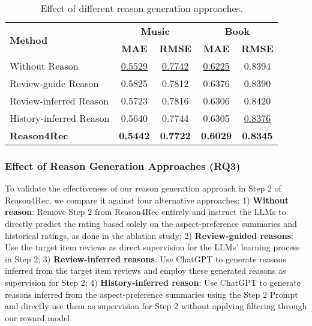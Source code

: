 \begin{table}[t]
\centering
\caption{Effect of different reason generation approaches.}
\begin{tabular}{lcccc}
\toprule
\multirow{2}{*}{\bf Method} & \multicolumn{2}{c}{\bf Music} & \multicolumn{2}{c}{\bf Book} \\ \cmidrule(lr){2-3} \cmidrule(lr){4-5}
                        & \bf MAE             & \bf RMSE           & \bf MAE             & \bf RMSE           \\ \midrule

Without Reason          & \underline{0.5529}          & \underline{0.7742}          & \underline{0.6225}          & 0.8394          \\
Review-guide Reason              & 0.5825          & 0.7812          & 0.6376          & 0.8390          \\
Review-inferred Reason   & 0.5723          & 0.7816          & 0.6306          & 0.8420          \\
History-inferred Reason        & 0.5640          & 0.7744          & 0.6305          & \underline{0.8376}         \\
\textbf{Reason4Rec}                    & \textbf{0.5442} & \textbf{0.7722} & \textbf{0.6029} & \textbf{0.8345} \\
\bottomrule
\end{tabular}
\label{tab:reason-gen}
\end{table}

   
\subsubsection{\textbf{Effect of Reason Generation Approaches (RQ3)}} \label{sec:impact_of_verbalized}
To validate the effectiveness of our reason generation approach in Step 2 of Reason4Rec, we compare it against four alternative approaches:
1) \textbf{Without reason}: Remove Step 2 from Reason4Rec entirely and instruct the LLMs to directly predict the rating based solely on the aspect-preference summaries and historical ratings, as done in the ablation study;
2) \textbf{Review-guided reasons}: Use the target item reviews as direct supervision for the LLMs' learning process in Step 2;
3) \textbf{Review-inferred reasons}: Use ChatGPT to generate reasons inferred from the target item reviews and employ these generated reasons as supervision for Step 2;
4) \textbf{History-inferred reason}: Use ChatGPT to generate reasons inferred from the aspect-preference summaries using the Step 2 Prompt and directly use them as supervision for Step 2 without applying filtering through our reward model.

